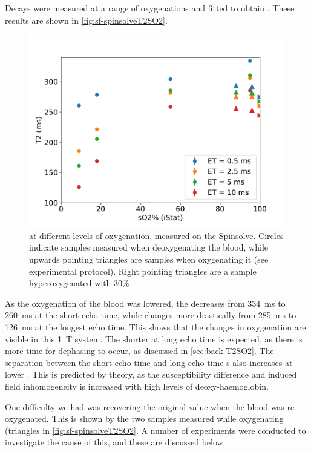 Decays were measured at a range of oxygenations and fitted to obtain \Ttwo.
These results are shown in \autoref{fig:sf-spinsolveT2SO2}.

\begin{figure}[ht]
\centering
\includegraphics[width=\textwidth]{figures/stoppedflow/spinsolveT2SO2down.pdf}
\caption[\Ttwo vs. \SOtwo measured on the Spinsolve]{\Ttwo at different levels of oxygenation, measured on the Spinsolve. Circles indicate samples measured when deoxygenating the blood, while upwards pointing triangles are samples when oxygenating it (see experimental protocol). Right pointing triangles are a sample hyperoxygenated with 30\% \Otwo}
\label{fig:sf-spinsolveT2SO2}
\end{figure}

As the oxygenation of the blood was lowered, the \Ttwo decreases from \SI{334}{ms} to \SI{260}{ms} at the short echo time, while changes more drastically from \SI{285}{ms} to \SI{126}{ms} at the longest echo time.
This shows that the changes in oxygenation are visible in this \SI{1}{T} system.
The shorter \Ttwo at long echo time is expected, as there is more time for dephasing to occur, as discussed in \autoref{sec:back-T2SO2}.
The separation between the short echo time and long echo time \Ttwo{}s also increases at lower \SOtwo.
This is predicted by theory, as the susceptibility difference and induced field inhomogeneity is increased with high levels of deoxy-haemoglobin.

One difficulty we had was recovering the original \Ttwo value when the blood was re-oxygenated.
This is shown by the two samples measured while oxygenating (triangles in \autoref{fig:sf-spinsolveT2SO2}.
A number of experiments were conducted to investigate the cause of this, and these are discussed below.

